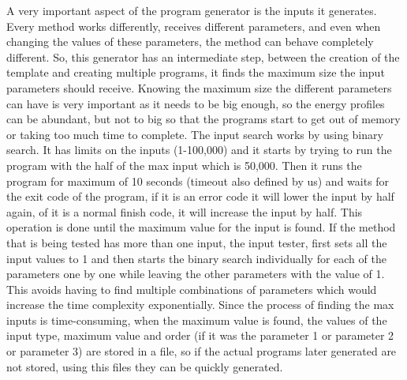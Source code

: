 A very important aspect of the program generator is the inputs it generates. Every method works differently, receives different parameters, and even when changing the values of these parameters, the method can behave completely different. So, this generator has an intermediate step, between the creation of the template and creating multiple programs, it finds the maximum size the input parameters should receive. Knowing the maximum size the different parameters can have is very important as it needs to be big enough, so the energy profiles can be abundant, but not to big so that the programs start to get out of memory or taking too much time to complete.
The input search works by using binary search. It has limits on the inputs (1-100,000) and it starts by trying to run the program with the half of the max input which is 50,000. Then it runs the program for maximum of 10 seconds (timeout also defined by us) and waits for the exit code of the program, if it is an error code it will lower the input by half again, of it is a normal finish code, it will increase the input by half. This operation is done until the maximum value for the input is found. If the method that is being tested has more than one input, the input tester, first sets all the input values to 1 and then starts the binary search individually for each of the parameters one by one while leaving the other parameters with the value of 1. This avoids having to find multiple combinations of parameters which would increase the time complexity exponentially. Since the process of finding the max inputs is time-consuming, when the maximum value is found, the values of the input type, maximum value and order (if it was the parameter 1 or parameter 2 or parameter 3) are stored in a file, so if the actual programs later generated are not stored, using this files they can be quickly generated.

